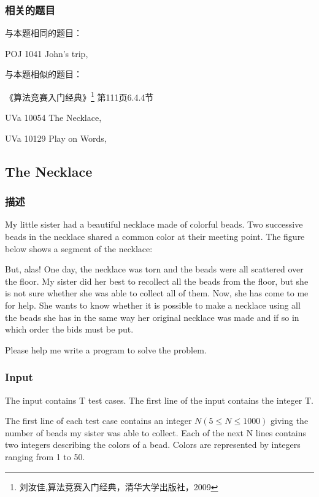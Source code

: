 \subsubsection{相关的题目}
与本题相同的题目：
\begindot
\item POJ 1041 John's trip, 
\myenddot

与本题相似的题目：
\begindot
\item 《算法竞赛入门经典》\footnote{刘汝佳,算法竞赛入门经典，清华大学出版社，2009} 第111页6.4.4节
\item  UVa 10054 The Necklace, 
\item  UVa 10129 Play on Words, 
\myenddot


\subsection{The Necklace}

\subsubsection{描述}
My little sister had a beautiful necklace made of colorful beads. Two successive beads in the 
necklace shared a common color at their meeting point. The figure below shows a segment of 
the necklace:
 
\centerline{}
 
But, alas! One day, the necklace was torn and the beads were all scattered over the floor. 
My sister did her best to recollect all the beads from the floor, but she is not sure 
whether she was able to collect all of them. Now, she has come to me for help. She wants
 to know whether it is possible to make a necklace using all the beads she has in the same
 way her original necklace was made and if so in which order the bids must be put.
 
Please help me write a program to solve the problem.
 
\subsubsection{Input}
The input contains T test cases. The first line of the input contains the integer T.
 
The first line of each test case contains an integer $N(5 \leq N \leq 1000)$ giving the number of beads 
my sister was able to collect. Each of the next N lines contains two integers describing 
the colors of a bead. Colors are represented by integers ranging from 1 to 50.
 
